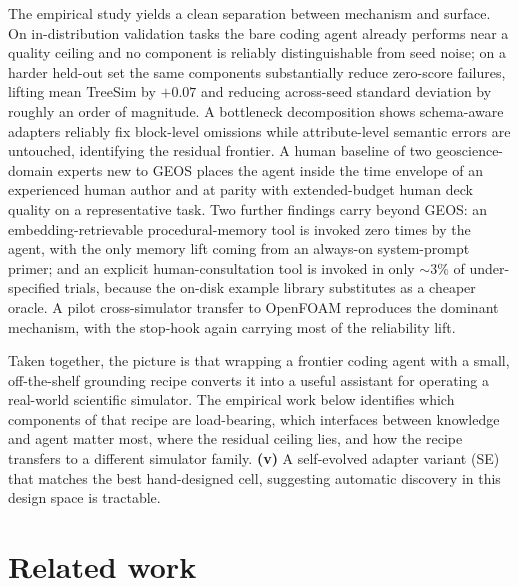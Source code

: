 \documentclass{article}
\begin{document}
The empirical study yields a clean separation between mechanism and surface. On in-distribution validation tasks the bare coding agent already performs near a quality ceiling and no component is reliably distinguishable from seed noise; on a harder held-out set the same components substantially reduce zero-score failures, lifting mean TreeSim by $+0.07$ and reducing across-seed standard deviation by roughly an order of magnitude. A bottleneck decomposition shows schema-aware adapters reliably fix block-level omissions while attribute-level semantic errors are untouched, identifying the residual frontier. A human baseline of two geoscience-domain experts new to GEOS places the agent inside the time envelope of an experienced human author and at parity with extended-budget human deck quality on a representative task. Two further findings carry beyond GEOS: an embedding-retrievable procedural-memory tool is invoked zero times by the agent, with the only memory lift coming from an always-on system-prompt primer; and an explicit human-consultation tool is invoked in only ${\sim}3\%$ of under-specified trials, because the on-disk example library substitutes as a cheaper oracle. A pilot cross-simulator transfer to OpenFOAM reproduces the dominant mechanism, with the stop-hook again carrying most of the reliability lift.

Taken together, the picture is that wrapping a frontier coding agent with a small, off-the-shelf grounding recipe converts it into a useful assistant for operating a real-world scientific simulator. The empirical work below identifies which components of that recipe are load-bearing, which interfaces between knowledge and agent matter most, where the residual ceiling lies, and how the recipe transfers to a different simulator family.
\textbf{(v)} A self-evolved adapter variant (SE) that matches the best hand-designed cell, suggesting automatic discovery in this design space is tractable.

\section{Related work}
\label{sec:related}
\end{document}
